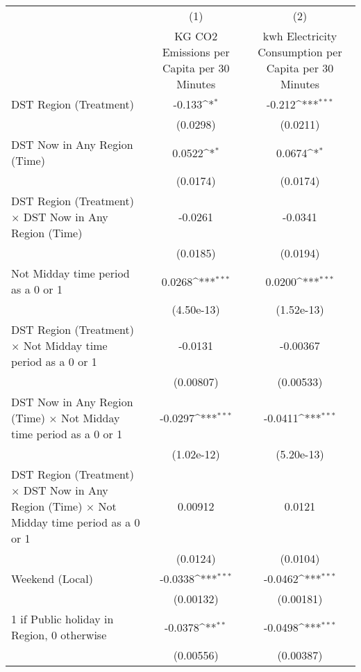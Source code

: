 {
\def\sym#1{\ifmmode^{#1}\else\(^{#1}\)\fi}
\begin{tabular}{l*{2}{c}}
\hline\hline
                    &\multicolumn{1}{c}{(1)}&\multicolumn{1}{c}{(2)}\\
                    &\multicolumn{1}{c}{KG CO2 Emissions per Capita per 30 Minutes}&\multicolumn{1}{c}{kwh Electricity Consumption per Capita per 30 Minutes}\\
\hline
DST Region (Treatment)&      -0.133\sym{*}  &      -0.212\sym{***}\\
                    &    (0.0298)         &    (0.0211)         \\
[1em]
DST Now in Any Region (Time)&      0.0522\sym{*}  &      0.0674\sym{*}  \\
                    &    (0.0174)         &    (0.0174)         \\
[1em]
DST Region (Treatment) $\times$ DST Now in Any Region (Time)&     -0.0261         &     -0.0341         \\
                    &    (0.0185)         &    (0.0194)         \\
[1em]
Not Midday time period as a 0 or 1&      0.0268\sym{***}&      0.0200\sym{***}\\
                    &  (4.50e-13)         &  (1.52e-13)         \\
[1em]
DST Region (Treatment) $\times$ Not Midday time period as a 0 or 1&     -0.0131         &    -0.00367         \\
                    &   (0.00807)         &   (0.00533)         \\
[1em]
DST Now in Any Region (Time) $\times$ Not Midday time period as a 0 or 1&     -0.0297\sym{***}&     -0.0411\sym{***}\\
                    &  (1.02e-12)         &  (5.20e-13)         \\
[1em]
DST Region (Treatment) $\times$ DST Now in Any Region (Time) $\times$ Not Midday time period as a 0 or 1&     0.00912         &      0.0121         \\
                    &    (0.0124)         &    (0.0104)         \\
[1em]
Weekend (Local)     &     -0.0338\sym{***}&     -0.0462\sym{***}\\
                    &   (0.00132)         &   (0.00181)         \\
[1em]
1 if Public holiday in Region, 0 otherwise&     -0.0378\sym{**} &     -0.0498\sym{***}\\
                    &   (0.00556)         &   (0.00387)         \\

\end{tabular}}
